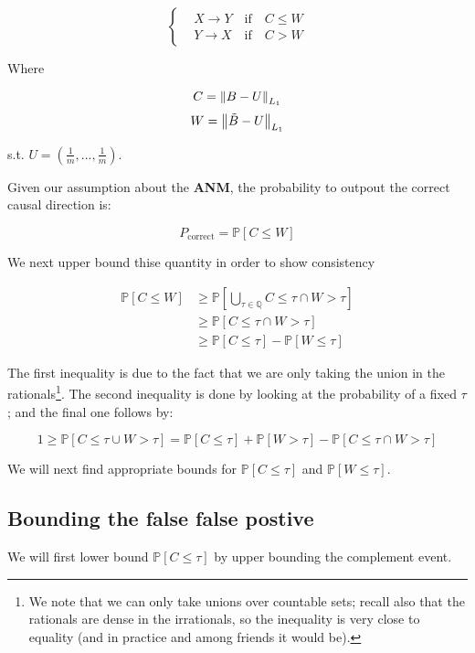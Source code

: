 \[ \begin{cases} 
    & X \rightarrow Y \quad \text{if} \quad C \leq W  \\
    & Y \rightarrow X \quad \text{if} \quad C > W  
 \end{cases}
\]

Where 

$$
    C = \left\lVert B - U\right\rVert_{L_1} 
$$
$$
    W = \left\lVert\tilde{B} - U\right\rVert_{L_1}
$$


s.t. $U = (\frac{1}{m}, ..., \frac{1}{m})$.

Given our assumption about the \textbf{ANM}, the probability to outpout the correct causal direction is:

$$
   P_{\text{correct}} = \mathbb{P}\left[C \leq W\right] 
$$

We next upper bound thise quantity in order to show consistency

\begin{align}
    \mathbb{P}\left[C \leq W\right] &\geq \mathbb{P}\left[ \underset{\tau \in \mathbb{Q}}{\bigcup} C \leq \tau \cap W > \tau \right] \\
    &\geq \mathbb{P}\left[C \leq \tau \cap W > \tau \right] \\
    &\geq \mathbb{P}\left[C \leq \tau \right] - \mathbb{P}\left[W \leq \tau \right]
\end{align}

The first inequality is due to the fact that we are only taking the union in the rationals\footnote{We note that
we can only take unions over countable sets; recall also that the rationals are dense in the irrationals, so the
inequality is very close to equality (and in practice and among friends it would be).}. The second inequality is done by 
looking at the probability of a fixed $\tau$; and the final one follows by:

$$
    1 \geq \mathbb{P}\left[ C \leq \tau \cup W > \tau \right] = 
    \mathbb{P}\left[ C \leq \tau \right] + \mathbb{P}\left[ W > \tau \right] - \mathbb{P}\left[ C \leq \tau \cap W > \tau \right]
$$

We will next find appropriate bounds for $\mathbb{P}\left[ C \leq \tau \right]$ and $\mathbb{P}\left[W \leq \tau \right]$.

\subsection{Bounding the false false postive}

We will first lower bound $\mathbb{P}\left[ C \leq \tau \right]$ by upper bounding the complement event.

